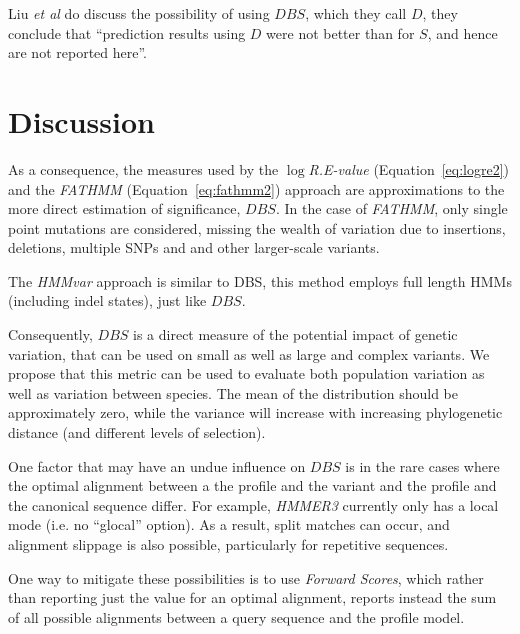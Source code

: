 \documentclass[fleqn,10pt]{SelfArx} %
\begin{document}
Liu \emph{et al} do discuss the possibility of using $DBS$, which they
call $D$, they conclude that ``prediction results using $D$ were not
better than for $S$, and hence are not reported here''.

\section{Discussion}

As a consequence, the measures used by the \emph{$\log$R.E-value}
(Equation~\ref{eq:logre2}) and the \emph{FATHMM}
(Equation~\ref{eq:fathmm2}) approach are approximations to the more
direct estimation of significance, $DBS$. In the case of
\emph{FATHMM}, only single point mutations are considered, missing the
wealth of variation due to insertions, deletions, multiple SNPs and
and other larger-scale variants.

The \emph{HMMvar} approach is similar to DBS, this method employs full
length HMMs (including indel states), just like $DBS$. 

Consequently, $DBS$ is a direct measure of the potential impact of
genetic variation, that can be used on small as well as large and
complex variants. We propose that this metric can be used to evaluate
both population variation as well as variation between species. The
mean of the distribution should be approximately zero, while the
variance will increase with increasing phylogenetic distance (and
different levels of selection). 

One factor that may have an undue influence on $DBS$ is in the rare
cases where the optimal alignment between a the profile and the
variant and the profile and the canonical sequence differ. For
example, \emph{HMMER3} currently only has a local mode (i.e. no
``glocal'' option). As a result, split matches can occur, and
alignment slippage is also possible, particularly for repetitive
sequences.

One way to mitigate these possibilities is to use \emph{Forward
  Scores}, which rather than reporting just the value for an optimal
alignment, reports instead the sum of all possible alignments between
a query sequence and the profile model. 



\end{document}
